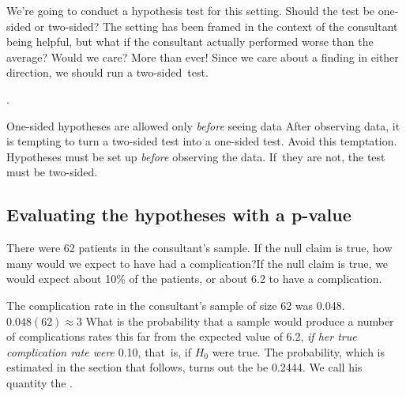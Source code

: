 \begin{example}{We're going to conduct a hypothesis test for this setting. Should the test be one-sided or two-sided?}
The setting has been framed in the context of the consultant being helpful, but what if the consultant actually performed worse than the average? Would we care? More than ever! Since we care about a finding in either direction, we should run a two-sided~test.
\end{example}

.

\begin{caution}{One-sided hypotheses are allowed only \emph{before} seeing data}
{After observing data, it is tempting to turn a two-sided test into a one-sided test. Avoid this temptation. Hypotheses must be set up \emph{before} observing the data. If~they are not, the test must be two-sided.}
\end{caution}



\subsection{Evaluating the hypotheses with  a p-value}

\begin{example}
{There were 62 patients in the consultant's sample.  If the null claim is true, how many would we expect to have had a complication?}If the null claim is true, we would expect about 10\% of the patients, or about 6.2 to have a complication.
\end{example}

The complication rate in the consultant's sample of size 62 was 0.048.  $0.048(62)\approx 3$ What is the probability that a sample would produce a number of complications rates this far from the expected value of 6.2, \emph{if her true complication rate were} 0.10, that~is, if $H_0$ were true.  The probability, which is estimated in the section that follows, turns out the be 0.2444.  We call his quantity the .

